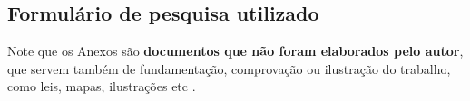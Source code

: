 
\begin{anexosenv}
\chapter{Formulário de pesquisa utilizado}
\label{anexoA}

Note que os  Anexos são  \textbf{documentos  que não foram  elaborados  pelo  autor},  que  servem  também  de  fundamentação, comprovação ou ilustração do trabalho, como leis, mapas, ilustrações etc .

\lipsum[4]




\end{anexosenv}
